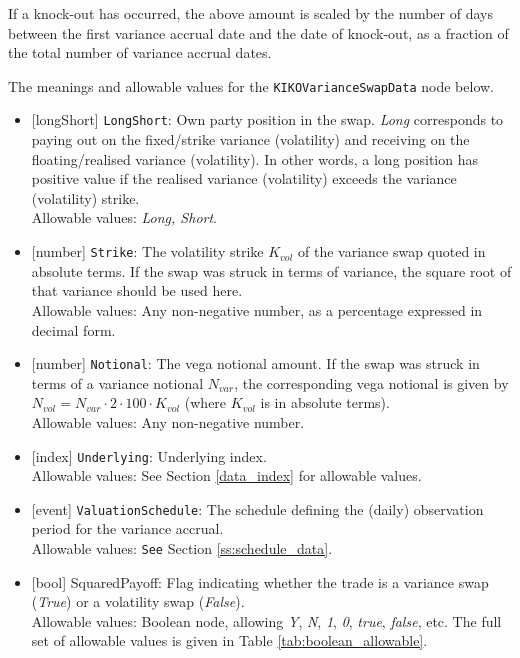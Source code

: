 If a knock-out has occurred, the above amount is scaled by the number of days between the first variance
accrual date and the date of knock-out, as a fraction of the total number of variance accrual dates.

The meanings and allowable values for the \lstinline!KIKOVarianceSwapData! node below.

\begin{itemize}
  \item{}[longShort] \lstinline!LongShort!: Own party position in the swap. \emph{Long} corresponds to paying out on the
  fixed/strike variance (volatility) and receiving on the floating/realised variance (volatility). In other words,
  a long position has positive value if the realised variance (volatility) exceeds the variance (volatility)
  strike. \\
  Allowable values: \emph{Long, Short}.
  \item{}[number] \lstinline!Strike!: The volatility strike $K_{vol}$ of the variance swap quoted in absolute terms.
  If the swap was struck in terms of variance, the square root of that variance should be used here. \\
  Allowable values: Any non-negative number, as a percentage expressed in decimal form.
  \item{}[number] \lstinline!Notional!: The vega notional amount. If the swap was struck in terms of a variance notional
  $N_{var}$, the corresponding vega notional is given by $N_{vol} = N_{var} \cdot 2 \cdot 100 \cdot K_{vol}$ (where
  $K_{vol}$ is in absolute terms). \\
  Allowable values: Any non-negative number.
  \item{}[index] \lstinline!Underlying!: Underlying index. \\
  Allowable values: See Section \ref{data_index} for allowable values.
  \item{}[event] \lstinline!ValuationSchedule!: The schedule defining the (daily) observation period for the variance accrual. \\
  Allowable values: \lstinline!See! Section \ref{ss:schedule_data}.
  \item{}[bool] SquaredPayoff: Flag indicating whether the trade is a variance swap (\emph{True}) or a volatility
  swap (\emph{False}). \\
  Allowable values: Boolean node, allowing \emph{Y}, \emph{N}, \emph{1}, \emph{0}, \emph{true}, \emph{false}, etc.
  The full set of allowable values is given in Table \ref{tab:boolean_allowable}.

\end{itemize}
